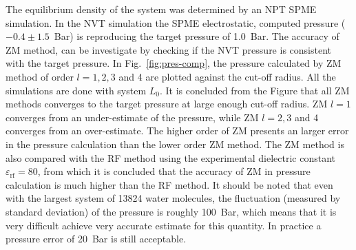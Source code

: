 \documentclass[aip,jcp,a4paper,preprint,unsortedaddress,onecolumn,fleqn]{revtex4-1}
\newcommand{\systemla}{L_0}
\begin{document}
The equilibrium density of the system was determined by an NPT SPME
simulation.  In the NVT simulation the SPME electrostatic, computed
pressure ($-0.4\pm 1.5$~Bar) is reproducing the target pressure of
1.0~Bar.  The accuracy of ZM method, can be investigate by checking if
the NVT pressure is consistent with the target pressure.  In
Fig.~\ref{fig:pres-comp}, the pressure calculated by ZM method of
order $l=1,2,3$ and 4 are plotted against the cut-off radius.
All the  simulations are done with system $\systemla$.
It is concluded from the Figure that all ZM methods converges to the
target pressure at large enough cut-off radius.
ZM $l=1$ converges from an under-estimate of the pressure, while ZM $l=2,3$ and 4 converges
from an over-estimate.
The higher order of ZM presents an larger error in the pressure calculation than
the lower order ZM method. The ZM method is also compared with
the RF method using the experimental dielectric constant $\varepsilon_{\textrm{rf}} = 80$, 
from which it is concluded that the accuracy of ZM in pressure calculation is much higher
than the RF method.
It should be noted that even with the largest system of 13824 water molecules,
the fluctuation (measured by standard deviation) of the pressure is roughly 100~Bar, which means that it is
very difficult achieve very accurate estimate for this quantity. In practice a pressure error of 20~Bar is
still acceptable. 
\end{document}
